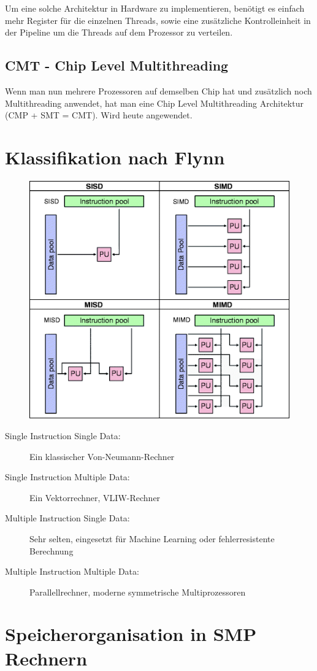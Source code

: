 Um eine solche Architektur in Hardware zu implementieren, benötigt es einfach mehr Register für die einzelnen Threads, sowie eine zusätzliche Kontrolleinheit in der Pipeline um die Threads auf dem Prozessor zu verteilen.

\subsection{CMT - Chip Level Multithreading}
Wenn man nun mehrere Prozessoren auf demselben Chip hat und zusätzlich noch Multithreading anwendet, hat man eine Chip Level Multithreading Architektur (CMP + SMT = CMT). Wird heute angewendet.

\section{Klassifikation nach Flynn}
\begin{figure}
\centering
\includegraphics[width=0.5\linewidth]{fig/flynn}
\caption{}
\label{fig:flynn}
\end{figure}
\begin{description}
	\item[Single Instruction Single Data:] Ein klassischer Von-Neumann-Rechner
	\item[Single Instruction Multiple Data:] Ein Vektorrechner, VLIW-Rechner
	\item[Multiple Instruction Single Data:]	Sehr selten, eingesetzt für Machine Learning oder fehlerresistente Berechnung
	\item[Multiple Instruction Multiple Data:] Parallellrechner, moderne symmetrische Multiprozessoren
\end{description}

\newpage

\section{Speicherorganisation in SMP Rechnern}

